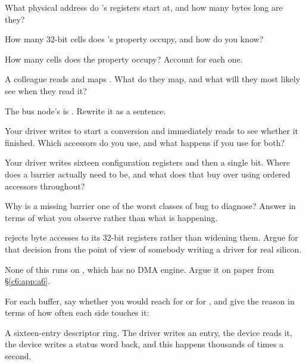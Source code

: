  What physical address do 's registers start at, and how many bytes long are
they?

 How many 32-bit cells does 's  property occupy, and how do you
know?

 How many cells does the  property occupy? Account for each one.

 A colleague reads  and maps . What do they map,
and what will they most likely see when they read it?

 The bus node's  is . Rewrite it as a
sentence.

\label{c6:ex:5}

 Your driver writes  to start a conversion and immediately reads 
to see whether it finished. Which accessors do you use, and what happens if you use 
for both?

 Your driver writes sixteen configuration registers and then a single  bit. Where
does a barrier actually need to be, and what does that buy over using ordered accessors throughout?

 Why is a missing barrier one of the worst classes of bug to diagnose? Answer in terms of
what you observe rather than what is happening.

  rejects byte accesses to its 32-bit registers rather than widening them.
Argue for that decision from the point of view of somebody writing a driver for real silicon.

\label{c6:ex:6}

None of this runs on , which has no DMA engine. Argue it on paper from
\S\ref{c6:app:a6}.

For each buffer, say whether you would reach for  or for
, and give the reason in terms of how often each side touches it:

 A sixteen-entry descriptor ring. The driver writes an entry, the device reads it, the
device writes a status word back, and this happens thousands of times a second.


